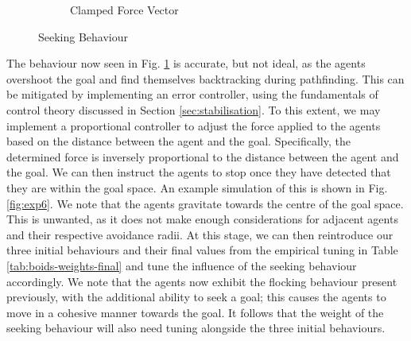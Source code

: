\documentclass[12pt]{article}
\begin{document}
\begin{figure}[ht]
\begin{subfigure}{.45\textwidth}
\caption{Clamped Force Vector}
\label{fig:exp5}
\end{subfigure}
\caption{Seeking Behaviour}
\label{fig:exp45}
\end{figure}

The behaviour now seen in Fig. \ref{fig:exp5} is accurate, but not ideal, as the agents overshoot the goal and find themselves backtracking during pathfinding. This can be mitigated by implementing an error controller, using the fundamentals of control theory discussed in Section \ref{sec:stabilisation}. To this extent, we may implement a proportional controller to adjust the force applied to the agents based on the distance between the agent and the goal. Specifically, the determined force is inversely proportional to the distance between the agent and the goal. We can then instruct the agents to stop once they have detected that they are within the goal space. An example simulation of this is shown in Fig. \ref{fig:exp6}. We note that the agents gravitate towards the centre of the goal space. This is unwanted, as it does not make enough considerations for adjacent agents and their respective avoidance radii. At this stage, we can then reintroduce our three initial behaviours and their final values from the empirical tuning in Table \ref{tab:boids-weights-final} and tune the influence of the seeking behaviour accordingly. We note that the agents now exhibit the flocking behaviour present previously, with the additional ability to seek a goal; this causes the agents to move in a cohesive manner towards the goal. It follows that the weight of the seeking behaviour will also need tuning alongside the three initial behaviours. 
\end{document}
